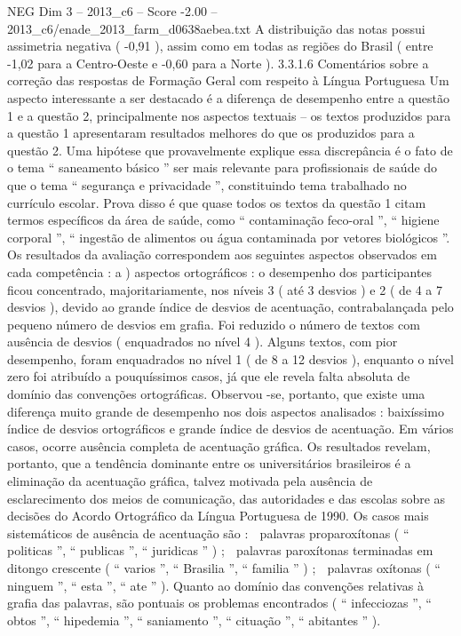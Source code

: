 \begin{textsample}{NEG Dim 3 – 2013\_c6 – Score -2.00 – 2013\_c6/enade\_2013\_farm\_d0638aebea.txt}
A distribuição das notas possui assimetria negativa ( -0,91 ), assim como em todas as regiões do Brasil ( entre -1,02 para a Centro-Oeste e -0,60 para a Norte ). 3.3.1.6 Comentários sobre a correção das respostas de Formação Geral com respeito à Língua Portuguesa Um aspecto interessante a ser destacado é a diferença de desempenho entre a questão 1 e a questão 2, principalmente nos aspectos textuais – os textos produzidos para a questão 1 apresentaram resultados melhores do que os produzidos para a questão 2.
Uma hipótese que provavelmente explique essa discrepância é o fato de o tema “ saneamento básico ” ser mais relevante para profissionais de saúde do que o tema “ segurança e privacidade ”, constituindo tema trabalhado no currículo escolar.
Prova disso é que quase todos os textos da questão 1 citam termos específicos da área de saúde, como “ contaminação feco-oral ”, “ higiene corporal ”, “ ingestão de alimentos ou água contaminada por vetores biológicos ”.
Os resultados da avaliação correspondem aos seguintes aspectos observados em cada competência : a ) aspectos ortográficos : o desempenho dos participantes ficou concentrado, majoritariamente, nos níveis 3 ( até 3 desvios ) e 2 ( de 4 a 7 desvios ), devido ao grande índice de desvios de acentuação, contrabalançada pelo pequeno número de desvios em grafia.
Foi reduzido o número de textos com ausência de desvios ( enquadrados no nível 4 ).
Alguns textos, com pior desempenho, foram enquadrados no nível 1 ( de 8 a 12 desvios ), enquanto o nível zero foi atribuído a pouquíssimos casos, já que ele revela falta absoluta de domínio das convenções ortográficas.
Observou -se, portanto, que existe uma diferença muito grande de desempenho nos dois aspectos analisados : baixíssimo índice de desvios ortográficos e grande índice de desvios de acentuação.
Em vários casos, ocorre ausência completa de acentuação gráfica.
Os resultados revelam, portanto, que a tendência dominante entre os universitários brasileiros é a eliminação da acentuação gráfica, talvez motivada pela ausência de esclarecimento dos meios de comunicação, das autoridades e das escolas sobre as decisões do Acordo Ortográfico da Língua Portuguesa de 1990.
Os casos mais sistemáticos de ausência de acentuação são :  palavras proparoxítonas ( “ politicas ”, “ publicas ”, “ juridicas ” ) ;  palavras paroxítonas terminadas em ditongo crescente ( “ varios ”, “ Brasilia ”, “ familia ” ) ;  palavras oxítonas ( “ ninguem ”, “ esta ”, “ ate ” ).
Quanto ao domínio das convenções relativas à grafia das palavras, são pontuais os problemas encontrados ( “ infecciozas ”, “ obtos ”, “ hipedemia ”, “ saniamento ”, “ cituação ”, “ abitantes ” ).

\end{textsample}
